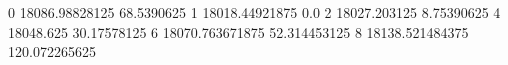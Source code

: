 0 18086.98828125 68.5390625
1 18018.44921875 0.0
2 18027.203125 8.75390625
4 18048.625 30.17578125
6 18070.763671875 52.314453125
8 18138.521484375 120.072265625
